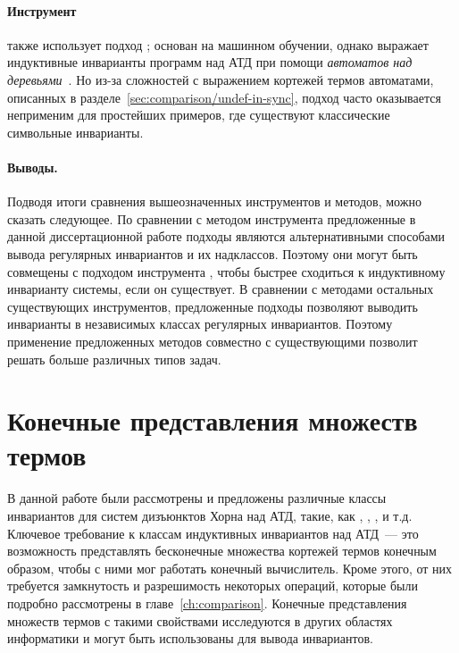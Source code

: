 \paragraph{Инструмент \rchc{}~\cite{haude2020,losekoot_et_al:LIPIcs.FSCD.2023.7}} также использует подход \ice{}; \rchc{} основан на машинном обучении, однако выражает индуктивные инварианты программ над АТД при помощи \emph{автоматов над деревьями}~\cite{tata}. Но из-за сложностей с выражением кортежей термов автоматами, описанных в разделе~\ref{sec:comparison/undef-in-sync}, подход часто оказывается неприменим для простейших примеров, где существуют классические символьные инварианты. 

\paragraph{Выводы.} Подводя итоги сравнения вышеозначенных инструментов и методов, можно сказать следующее. По сравнении с методом инструмента \rchc{} предложенные в данной диссертационной работе подходы являются альтернативными способами вывода регулярных инвариантов и их надклассов. Поэтому они могут быть совмещены с подходом инструмента \rchc{}, чтобы быстрее сходиться к индуктивному инварианту системы, если он существует. В сравнении с методами остальных существующих инструментов, предложенные подходы позволяют выводить инварианты в независимых классах регулярных инвариантов. Поэтому применение предложенных методов совместно с существующими позволит решать больше различных типов задач.

\section{Конечные представления множеств термов}\label{sec:relatedWork/modelBuilding}
В данной работе были рассмотрены и предложены различные классы инвариантов для систем дизъюнктов Хорна над АТД, такие, как \elemclass{}, \regclass{}, \syncRegFlatClass{}, \syncRegFullClass{} и т.д. Ключевое требование к классам индуктивных инвариантов над АТД~--- это возможность представлять бесконечные множества кортежей термов конечным образом, чтобы с ними мог работать конечный вычислитель. Кроме этого, от них требуется замкнутость и разрешимость некоторых операций, которые были подробно рассмотрены в главе~\ref{ch:comparison}. Конечные представления множеств термов с такими свойствами исследуются в других областях информатики и могут быть использованы для вывода инвариантов.

